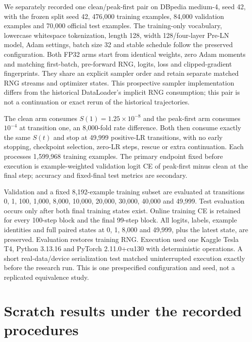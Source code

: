 \documentclass[referee,pdflatex,sn-mathphys-num]{sn-jnl}
\begin{document}
We separately recorded one clean/peak-first pair on DBpedia medium-4, seed 42, with the frozen split seed 42, 476,000 training examples, 84,000 validation examples and 70,000 official test examples. The training-only vocabulary, lowercase whitespace tokenization, length 128, width 128/four-layer Pre-LN model, Adam settings, batch size 32 and stable schedule follow the preserved configuration. Both FP32 arms start from identical weights, zero Adam moments and matching first-batch, pre-forward RNG, logits, loss and clipped-gradient fingerprints. They share an explicit sampler order and retain separate matched RNG streams and optimizer states. This prospective sampler implementation differs from the historical DataLoader's implicit RNG consumption; this pair is not a continuation or exact rerun of the historical trajectories.

The clean arm consumes \(S(1)=1.25\times10^{-8}\) and the peak-first arm consumes \(10^{-4}\) at transition one, an 8,000-fold rate difference. Both then consume exactly the same \(S(t)\) and stop at 49,999 positive-LR transitions, with no early stopping, checkpoint selection, zero-LR steps, rescue or extra continuation. Each processes 1,599,968 training examples. The primary endpoint fixed before execution is example-weighted validation logit CE of peak-first minus clean at the final step; accuracy and fixed-final test metrics are secondary.

Validation and a fixed 8,192-example training subset are evaluated at transitions 0, 1, 100, 1,000, 8,000, 10,000, 20,000, 30,000, 40,000 and 49,999. Test evaluation occurs only after both final training states exist. Online training CE is retained for every 100-step block and the final 99-step block. All logits, labels, example identities and full paired states at 0, 1, 8,000 and 49,999, plus the latest state, are preserved. Evaluation restores training RNG. Execution used one Kaggle Tesla T4, Python 3.13.16 and PyTorch 2.11.0+cu130 with deterministic operations. A short real-data/device serialization test matched uninterrupted execution exactly before the research run. This is one prespecified configuration and seed, not a replicated equivalence study.


\section{Scratch results under the recorded procedures}\label{scratch-results-under-the-recorded-procedures}
\end{document}
